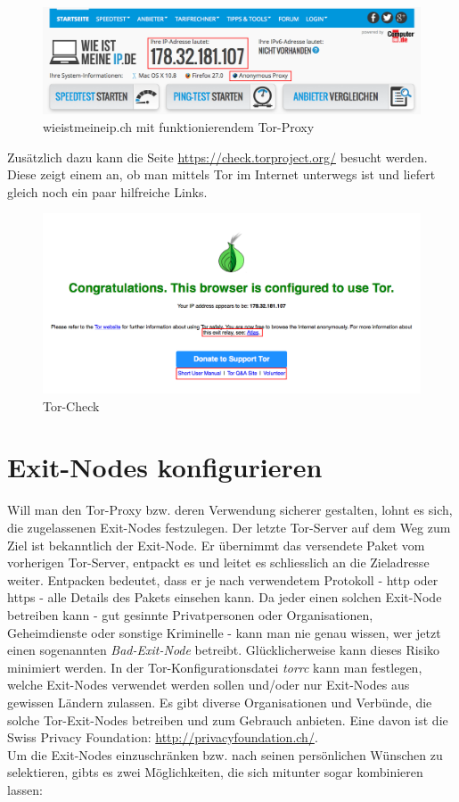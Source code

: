 \begin{figure}[h]
\centering
\includegraphics[scale=0.4]{images/wieistmeineip}
\caption{wieistmeineip.ch mit funktionierendem Tor-Proxy}
\end{figure}

Zusätzlich dazu kann die Seite \url{https://check.torproject.org/} besucht werden. Diese zeigt einem an, ob man mittels Tor im Internet unterwegs ist und liefert gleich noch ein paar hilfreiche Links.

\begin{figure}[h]
\centering
\includegraphics[scale=0.4]{images/torcheck}
\caption{Tor-Check}
\end{figure}

\section{Exit-Nodes konfigurieren}
Will man den Tor-Proxy bzw. deren Verwendung sicherer gestalten, lohnt es sich, die zugelassenen Exit-Nodes festzulegen. Der letzte Tor-Server auf dem Weg zum Ziel ist bekanntlich der Exit-Node. Er übernimmt das versendete Paket vom vorherigen Tor-Server, entpackt es und leitet es schliesslich an die Zieladresse weiter. Entpacken bedeutet, dass er je nach verwendetem Protokoll - http oder https - alle Details des Pakets einsehen kann. Da jeder einen solchen Exit-Node betreiben kann - gut gesinnte Privatpersonen oder Organisationen, Geheimdienste oder sonstige Kriminelle - kann man nie genau wissen, wer jetzt einen sogenannten \textit{Bad-Exit-Node} betreibt. Glücklicherweise kann dieses Risiko minimiert werden. In der Tor-Konfigurationsdatei \textit{torrc} kann man festlegen, welche Exit-Nodes verwendet werden sollen und/oder nur Exit-Nodes aus gewissen Ländern zulassen. Es gibt diverse Organisationen und Verbünde, die solche Tor-Exit-Nodes betreiben und zum Gebrauch anbieten. Eine davon ist die Swiss Privacy Foundation: \url{http://privacyfoundation.ch/}.
\\
Um die Exit-Nodes einzuschränken bzw. nach seinen persönlichen Wünschen zu selektieren, gibts es zwei Möglichkeiten, die sich mitunter sogar kombinieren lassen: 

